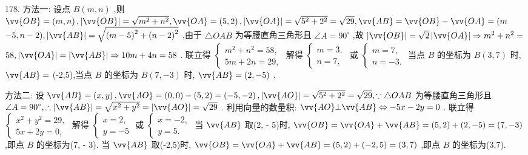 178. 方法一: 设点 $B\left( {m,n}\right)$ ,则 $\vv{OB} = \left( {m,n}\right) ,\left| \vv{OB}\right|  = \sqrt{{m}^{2} + {n}^{2}},\vv{OA} = \left( {5,2}\right) ,\left| \vv{OA}\right|  = \sqrt{{5}^{2} + {2}^{2}} = \sqrt{29},\vv{AB} = \vv{OB} - \vv{OA} = (m$  $- 5,n - 2),\left| \vv{AB}\right|  = \sqrt{{\left( m - 5\right) }^{2} + {\left( n - 2\right) }^{2}}$ ,由于 $\bigtriangleup {OAB}$ 为等腰直角三角形且 $\angle A = {90}^{ \circ  }$ ,故 $\left| \vv{OB}\right|  = \sqrt{2}\left| \vv{OA}\right|  \Rightarrow  {m}^{2} + {n}^{2} =$  ${58},\left| \vv{OA}\right|  = \left| \vv{AB}\right|  \Rightarrow  {10m} + {4n} = {58}$ . 联立得 $\left\{  \begin{array}{l} {m}^{2} + {n}^{2} = {58}, \\  {5m} + {2n} = {29}, \end{array}\right.$ 解得 $\left\{  \begin{array}{l} m = 3, \\  n = 7, \end{array}\right.$ 或 $\left\{  \begin{array}{l} m = 7, \\  n =  - 3. \end{array}\right.$ 当点 $B$ 的坐标为 $B\left( {3,7}\right)$ 时, $\vv{AB} =$ (-2,5),当点 $B$ 的坐标为 $B\left( {7, - 3}\right)$ 时, $\vv{AB} = \left( {2, - 5}\right)$ .

方法二: 设 $\vv{AB} = \left( {x,y}\right) ,\vv{AO} = \left( {0,0}\right)  - \left( {5,2}\right)  = \left( {-5, - 2}\right) ,\left| \vv{AO}\right|  = \sqrt{{5}^{2} + {2}^{2}} = \sqrt{29},\because \bigtriangleup {OAB}$ 为等腰直角三角形且 $\angle A = {90}^{ \circ  },\therefore \left| \vv{AB}\right|  = \sqrt{{x}^{2} + {y}^{2}} = \left| \vv{AO}\right|  = \sqrt{29}$ . 利用向量的数量积: $\vv{AO}\bot \vv{AB} \Leftrightarrow   - {5x} - {2y} = 0$ . 联立得 $\left\{  \begin{array}{l} {x}^{2} + {y}^{2} = {29}, \\  {5x} + {2y} = 0, \end{array}\right.$ 解得 $\left\{  \begin{array}{l} x = 2, \\  y =  - 5 \end{array}\right.$ 或 $\left\{  \begin{array}{l} x =  - 2, \\  y = 5. \end{array}\right.$ 当 $\vv{AB}$ 取(2, - 5)时, $\vv{OB} = \vv{OA} + \vv{AB} = \left( {5,2}\right)  + \left( {2, - 5}\right)  = \left( {7, - 3}\right)$ ,即点 $B$ 的坐标为(7, - 3). 当 $\vv{AB}$ 取(-2,5)时, $\vv{OB} = \vv{OA} + \vv{AB} = \left( {5,2}\right)  + \left( {-2,5}\right)  = \left( {3,7}\right)$ ,即点 $B$ 的坐标为(3,7).

